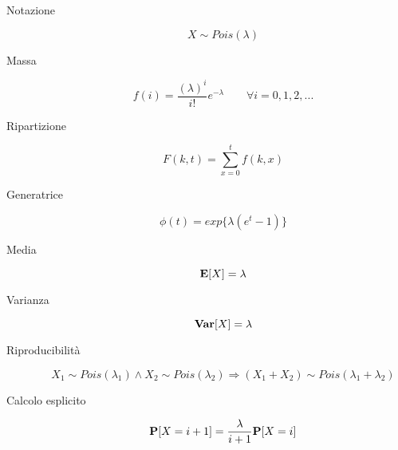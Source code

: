 \begin{description}
	
	\item [Notazione]
		\begin{equation}
		X \sim Pois(\lambda)
		\end{equation}

	\item [Massa]
		\begin{equation}
		f(i) = \frac{(\lambda)^{i}}{i!}e^{-\lambda} \qquad\forall i=0,1,2,...
		\end{equation}

	\item [Ripartizione]
		\begin{equation}
		F(k,t) = \sum_{x=0}^{t} f(k,x)
		\end{equation}
		
	\item [Generatrice]
		\begin{equation}
		\phi(t) = exp\{\lambda(e^{t}-1)\}
		\end{equation}

	\item [Media]
		\begin{equation}
		\mathbf{E}[X] = \lambda
		\end{equation}

	\item [Varianza]
		\begin{equation}
		\mathbf{Var}[X] = \lambda
		\end{equation}
		
	\item [Riproducibilità]
		\begin{equation}
			X_{1} \sim Pois(\lambda_{1}) \land X_{2} \sim Pois(\lambda_{2}) \Rightarrow (X_{1}+X_{2})\sim Pois(\lambda_{1}+\lambda_{2})
		\end{equation}
		
	\item [Calcolo esplicito]
		\begin{equation}
		\mathbf{P}[X=i+1] = \frac{\lambda}{i+1}\mathbf{P}[X=i]
		\end{equation}
		



\end{description}
